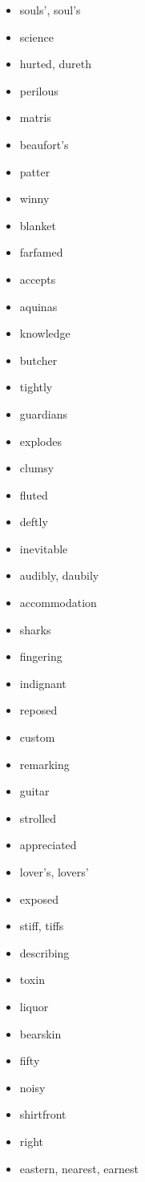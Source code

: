 \documentclass{article}
\begin{document}
\begin{itemize}
    \item souls', soul's
    \item science
    \item hurted, dureth
    \item perilous
    \item matris
    \item beaufort's
    \item patter
    \item winny
    \item blanket
    \item farfamed
    \item accepts
    \item aquinas
    \item knowledge
    \item butcher
    \item tightly
    \item guardians
    \item explodes
    \item clumsy
    \item fluted
    \item deftly
    \item inevitable
    \item audibly, daubily
    \item accommodation
    \item sharks
    \item fingering
    \item indignant
    \item reposed
    \item custom
    \item remarking
    \item guitar
    \item strolled
    \item appreciated
    \item lover's, lovers'
    \item exposed
    \item stiff, tiffs
    \item describing
    \item toxin
    \item liquor
    \item bearskin
    \item fifty
    \item noisy
    \item shirtfront
    \item right
    \item eastern, nearest, earnest

\end{itemize}
\end{document}
